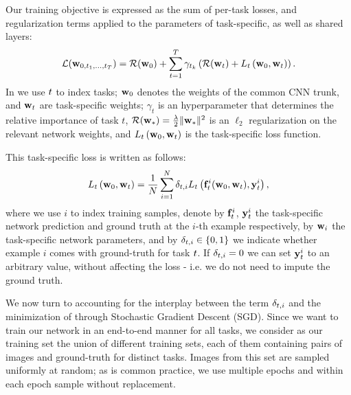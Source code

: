 \documentclass[10pt,twocolumn,letterpaper]{article}
\begin{document}

Our training objective is expressed as the sum of per-task losses, and regularization terms applied to the parameters of task-specific, as well as shared layers:
\begin{gather}
\mathcal{L}(\mathbf{w}_{0,t_1,\ldots,t_T}) = \mathcal{R}(\mathbf{w}_{0}) + \sum_{t=1}^T  \gamma_{t_k} \left(\mathcal{R}(\mathbf{w}_{t})  +  L_{t}\left(\mathbf{w}_{0},\mathbf{w}_{t}\right)\right).
\label{eq:objective}
\end{gather}
In  we use $t$ to index tasks; $\mathbf{w}_{0}$ denotes the weights of the common CNN trunk,  and $\mathbf{w}_{{t}}$ are task-specific weights; $\gamma_t$ is an hyperparameter that determines the relative importance of task $t$,
 $\mathcal{R}(\mathbf{w}_{\mathrm{\ast}}) =  \frac{\lambda}{2}\|\mathbf{w}_{\mathrm{\ast}}\|^2$ is an $\ell_2$ regularization on the relevant network weights, and $L_{t}\left(\mathbf{w}_{0},\mathbf{w}_{t}\right)$ is the task-specific loss function.


This task-specific loss  is written as follows:
\begin{gather}
L_{t}\left(\mathbf{w}_{0},\mathbf{w}_{t}\right) = \frac{1}{N}\sum_{i=1}^{N}  \delta_{t,i} L_{t}\left(\mathbf{f}^{i}_{t}(\mathbf{w}_{0},\mathbf{w}_{t}),\mathbf{y}^{i}_{t}\right),
\end{gather}
where we use $i$ to index training samples, denote by $\mathbf{f}^{i}_{t}$,
$\mathbf{y}^{i}_{t}$  the task-specific network prediction and ground truth at the $i$-th example respectively, by $\mathbf{w}_{i}$ the task-specific network parameters, and by $\delta_{t,i} \in \{0,1\}$ we indicate whether  example $i$ comes with ground-truth for  task $t$.
If $\delta_{t,i}=0$ we can set $\mathbf{y}^{i}_{t}$ to an arbitrary value, without affecting the loss - i.e. we do not need to impute the ground truth. 

We now turn to accounting for  the interplay  between the term $\delta_{t,i}$ and the minimization of 
through Stochastic Gradient Descent (SGD). Since we want to train our network in an end-to-end manner for all tasks, we consider as our training set the union of different training sets, each of them containing pairs of images and ground-truth for distinct tasks. Images from this set are sampled uniformly at random; as is common practice, we  use multiple epochs and within each epoch sample without replacement. 
\end{document}
